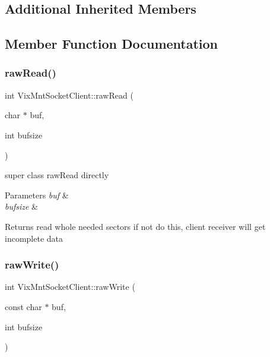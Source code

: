 \subsection*{Additional Inherited Members}


\subsection{Member Function Documentation}
\hypertarget{class_vix_mnt_socket_client_a6fd660d4eae9b0a364404af9c9e3e5e4}{}\label{class_vix_mnt_socket_client_a6fd660d4eae9b0a364404af9c9e3e5e4} 
\subsubsection{\texorpdfstring{raw\+Read()}{rawRead()}}
{\ttfamily int Vix\+Mnt\+Socket\+Client\+::raw\+Read (\begin{DoxyParamCaption}\item[{char $\ast$}]{buf,  }\item[{int}]{bufsize }\end{DoxyParamCaption})}



super class raw\+Read directly 


\begin{DoxyParams}{Parameters}
{\em buf} & \\
\hline
{\em bufsize} & \\
\hline
\end{DoxyParams}
\begin{DoxyReturn}{Returns}
read whole needed sectors if not do this, client receiver will get incomplete data 
\end{DoxyReturn}
\hypertarget{class_vix_mnt_socket_client_a4c5cec6460e972d41308f21edada8b6b}{}\label{class_vix_mnt_socket_client_a4c5cec6460e972d41308f21edada8b6b} 
\subsubsection{\texorpdfstring{raw\+Write()}{rawWrite()}}
{\ttfamily int Vix\+Mnt\+Socket\+Client\+::raw\+Write (\begin{DoxyParamCaption}\item[{const char $\ast$}]{buf,  }\item[{int}]{bufsize }\end{DoxyParamCaption})}



